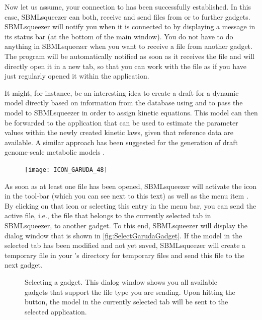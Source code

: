Now let us assume, your connection to \Garuda has been successfully established.
In this case, SBMLsqueezer can both, receive and send \SBML files from or to further gadgets.
SBMLsqueezer will notify you when it is connected to \Garuda by displaying a message in its status bar (at the bottom of the main window).
You do not have to do anything in SBMLsqueezer when you want to receive a file from another gadget.
The program will be automatically notified as soon as it receives the file and will directly open it in a new tab, so that you can work with the file as if you have just regularly opened it within the application.

It might, for instance, be an interesting idea to create a draft for a dynamic model directly based on information from the \KEGG database using \KEGGtranslator \citep{Wrzodek2011, Wrzodek2013} and to pass the model to SBMLsqueezer in order to assign kinetic equations. This model can then be forwarded to the application \SBMLsimulator \citep{Keller2013} that can be used to estimate the parameter values within the newly created kinetic laws, given that reference data are available.
A similar approach has been suggested for the generation of draft genome-scale metabolic models \citep{Buechel2013}.

\begin{figure}
\vspace{\wrapfigspace}
\texttt{[image: ICON\_GARUDA\_48]}
\end{figure}
As soon as at least one \SBML file has been opened, SBMLsqueezer will activate the \Garuda icon in the tool-bar (which you can see next to this text) as well as the menu item .
By clicking on that icon or selecting this entry in the menu bar, you can send the active file, i.e., the file that belongs to the currently selected tab in SBMLsqueezer, to another gadget.
To this end, SBMLsqueezer will display the dialog window that is shown in \vref{fig:SelectGarudaGadget}.
If the model in the selected tab has been modified and not yet saved, SBMLsqueezer will create a temporary file in your \OS's directory for temporary files and send this file to the next gadget.
\begin{figure}
\caption[Selecting a \Garuda gadget]{Selecting a \Garuda gadget.
This dialog window shows you all available \Garuda gadgets that support the file type you are sending.
Upon hitting the  button, the model in the currently selected tab will be sent to the selected application.}
\label{fig:SelectGarudaGadget}
\end{figure}

